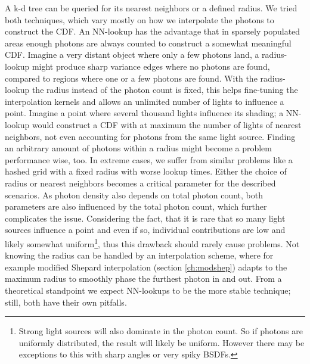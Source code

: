A k-d tree can be queried for its nearest neighbors or a defined radius. We tried both techniques, which vary mostly on how we interpolate the photons to construct the CDF. An NN-lookup has the advantage that in sparsely populated areas enough photons are always counted to construct a somewhat meaningful CDF. Imagine a very distant object where only a few photons land, a radius-lookup might produce sharp variance edges where no photons are found, compared to regions where one or a few photons are found. With the radius-lookup the radius instead of the photon count is fixed, this helps fine-tuning the interpolation kernels and allows an unlimited number of lights to influence a point. Imagine a point where several thousand lights influence its shading; a NN-lookup would construct a CDF with at maximum the number of lights of nearest neighbors, not even accounting for photons from the same light source. Finding an arbitrary amount of photons within a radius might become a problem performance wise, too. In extreme cases, we suffer from similar problems like a hashed grid with a fixed radius with worse lookup times. Either the choice of radius or nearest neighbors becomes a critical parameter for the described scenarios. As photon density also depends on total photon count, both parameters are also influenced by the total photon count, which further complicates the issue. Considering the fact, that it is rare that so many light sources influence a point and even if so, individual contributions are low and likely somewhat uniform\footnote{Strong light sources will also dominate in the photon count. So if photons are uniformly distributed, the result will likely be uniform. However there may be exceptions to this with sharp angles or very spiky BSDFs.}, thus this drawback should rarely cause problems. Not knowing the radius can be handled by an interpolation scheme, where for example modified Shepard interpolation (section \ref{ch:modshep}) adapts to the maximum radius to smoothly phase the furthest photon in and out. From a theoretical standpoint we expect NN-lookups to be the more stable technique; still, both have their own pitfalls. 

